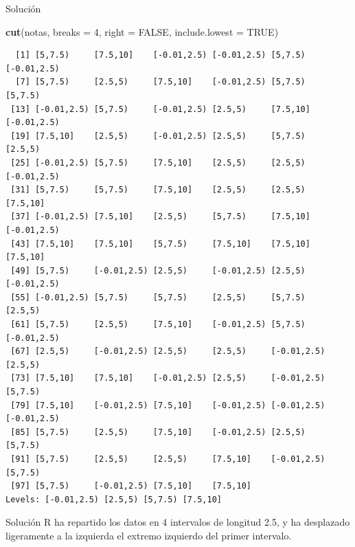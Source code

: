 \documentclass[
  ignorenonframetext,
]{beamer}
\newenvironment{Shaded}{\begin{snugshade}}{\end{snugshade}}
\newcommand{\AttributeTok}[1]{\textcolor[rgb]{0.13,0.29,0.53}{#1}}
\newcommand{\ConstantTok}[1]{\textcolor[rgb]{0.56,0.35,0.01}{#1}}
\newcommand{\DecValTok}[1]{\textcolor[rgb]{0.00,0.00,0.81}{#1}}
\newcommand{\FunctionTok}[1]{\textcolor[rgb]{0.13,0.29,0.53}{\textbf{#1}}}
\newcommand{\NormalTok}[1]{#1}
\begin{document}
\begin{frame}[fragile]{Solución}
\label{soluciuxf3n-23}
\begin{Shaded}
\begin{Highlighting}[]
\FunctionTok{cut}\NormalTok{(notas, }\AttributeTok{breaks =} \DecValTok{4}\NormalTok{, }\AttributeTok{right =} \ConstantTok{FALSE}\NormalTok{, }\AttributeTok{include.lowest =} \ConstantTok{TRUE}\NormalTok{)}
\end{Highlighting}
\end{Shaded}

\begin{verbatim}
  [1] [5,7.5)     [7.5,10]    [-0.01,2.5) [-0.01,2.5) [5,7.5)     [-0.01,2.5)
  [7] [5,7.5)     [2.5,5)     [7.5,10]    [-0.01,2.5) [5,7.5)     [5,7.5)    
 [13] [-0.01,2.5) [5,7.5)     [-0.01,2.5) [2.5,5)     [7.5,10]    [-0.01,2.5)
 [19] [7.5,10]    [2.5,5)     [-0.01,2.5) [2.5,5)     [5,7.5)     [2.5,5)    
 [25] [-0.01,2.5) [5,7.5)     [7.5,10]    [2.5,5)     [2.5,5)     [-0.01,2.5)
 [31] [5,7.5)     [5,7.5)     [7.5,10]    [2.5,5)     [2.5,5)     [7.5,10]   
 [37] [-0.01,2.5) [7.5,10]    [2.5,5)     [5,7.5)     [7.5,10]    [-0.01,2.5)
 [43] [7.5,10]    [7.5,10]    [5,7.5)     [7.5,10]    [7.5,10]    [7.5,10]   
 [49] [5,7.5)     [-0.01,2.5) [2.5,5)     [-0.01,2.5) [2.5,5)     [-0.01,2.5)
 [55] [-0.01,2.5) [5,7.5)     [5,7.5)     [2.5,5)     [5,7.5)     [2.5,5)    
 [61] [5,7.5)     [2.5,5)     [7.5,10]    [-0.01,2.5) [5,7.5)     [-0.01,2.5)
 [67] [2.5,5)     [-0.01,2.5) [2.5,5)     [2.5,5)     [-0.01,2.5) [2.5,5)    
 [73] [7.5,10]    [7.5,10]    [-0.01,2.5) [2.5,5)     [-0.01,2.5) [5,7.5)    
 [79] [7.5,10]    [-0.01,2.5) [7.5,10]    [-0.01,2.5) [-0.01,2.5) [-0.01,2.5)
 [85] [5,7.5)     [2.5,5)     [7.5,10]    [-0.01,2.5) [2.5,5)     [5,7.5)    
 [91] [5,7.5)     [2.5,5)     [2.5,5)     [7.5,10]    [-0.01,2.5) [5,7.5)    
 [97] [5,7.5)     [-0.01,2.5) [7.5,10]    [7.5,10]   
Levels: [-0.01,2.5) [2.5,5) [5,7.5) [7.5,10]
\end{verbatim}
\end{frame}

\begin{frame}{Solución}
\label{soluciuxf3n-24}
R ha repartido los datos en 4 intervalos de longitud 2.5, y ha
desplazado ligeramente a la izquierda el extremo izquierdo del primer
intervalo.
\end{frame}
\end{document}
